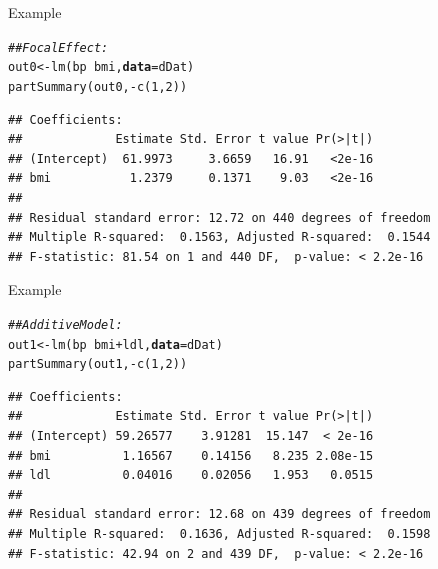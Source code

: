 \documentclass{beamer}\usepackage[]{graphicx}\usepackage[]{color}
\makeatletter
\newcommand{\hlnum}[1]{\textcolor[rgb]{0.69,0.494,0}{#1}}%
\newcommand{\hlcom}[1]{\textcolor[rgb]{0.514,0.506,0.514}{\textit{#1}}}%
\newcommand{\hlopt}[1]{\textcolor[rgb]{0,0,0}{#1}}%
\newcommand{\hlstd}[1]{\textcolor[rgb]{0,0,0}{#1}}%
\newcommand{\hlkwb}[1]{\textcolor[rgb]{0,0.341,0.682}{#1}}%
\newcommand{\hlkwc}[1]{\textcolor[rgb]{0,0,0}{\textbf{#1}}}%
\newcommand{\hlkwd}[1]{\textcolor[rgb]{0.004,0.004,0.506}{#1}}%
\newenvironment{kframe}{%
 \def\at@end@of@kframe{}%
 \ifinner\ifhmode%
  \def\at@end@of@kframe{\end{minipage}}%
  \begin{minipage}{\columnwidth}%
 \fi\fi%
 \def\FrameCommand##1{\hskip\@totalleftmargin \hskip-\fboxsep
 \colorbox{shadecolor}{##1}\hskip-\fboxsep
     \hskip-\linewidth \hskip-\@totalleftmargin \hskip\columnwidth}%
 \MakeFramed {\advance\hsize-\width
   \@totalleftmargin\z@ \linewidth\hsize
   \@setminipage}}%
 {\par\unskip\endMakeFramed%
 \at@end@of@kframe}
\newenvironment{knitrout}{}{} %
\makeatother
\begin{document}
\begin{frame}[fragile]{Example}



\begin{knitrout}\footnotesize
{}\color{fgcolor}\begin{kframe}
\begin{alltt}
\hlcom{## Focal Effect:}
\hlstd{out0} \hlkwb{<-} \hlkwd{lm}\hlstd{(bp} \hlopt{~} \hlstd{bmi,} \hlkwc{data} \hlstd{= dDat)}
\hlkwd{partSummary}\hlstd{(out0,} \hlopt{-}\hlkwd{c}\hlstd{(}\hlnum{1}\hlstd{,} \hlnum{2}\hlstd{))}
\end{alltt}
\begin{verbatim}
## Coefficients:
##             Estimate Std. Error t value Pr(>|t|)
## (Intercept)  61.9973     3.6659   16.91   <2e-16
## bmi           1.2379     0.1371    9.03   <2e-16
## 
## Residual standard error: 12.72 on 440 degrees of freedom
## Multiple R-squared:  0.1563,	Adjusted R-squared:  0.1544 
## F-statistic: 81.54 on 1 and 440 DF,  p-value: < 2.2e-16
\end{verbatim}
\end{kframe}
\end{knitrout}

\end{frame}


\begin{frame}[fragile]{Example}

\begin{knitrout}\footnotesize
{}\color{fgcolor}\begin{kframe}
\begin{alltt}
\hlcom{## Additive Model:}
\hlstd{out1} \hlkwb{<-} \hlkwd{lm}\hlstd{(bp} \hlopt{~} \hlstd{bmi} \hlopt{+} \hlstd{ldl,} \hlkwc{data} \hlstd{= dDat)}
\hlkwd{partSummary}\hlstd{(out1,} \hlopt{-}\hlkwd{c}\hlstd{(}\hlnum{1}\hlstd{,} \hlnum{2}\hlstd{))}
\end{alltt}
\begin{verbatim}
## Coefficients:
##             Estimate Std. Error t value Pr(>|t|)
## (Intercept) 59.26577    3.91281  15.147  < 2e-16
## bmi          1.16567    0.14156   8.235 2.08e-15
## ldl          0.04016    0.02056   1.953   0.0515
## 
## Residual standard error: 12.68 on 439 degrees of freedom
## Multiple R-squared:  0.1636,	Adjusted R-squared:  0.1598 
## F-statistic: 42.94 on 2 and 439 DF,  p-value: < 2.2e-16
\end{verbatim}
\end{kframe}
\end{knitrout}

\end{frame}
\end{document}
